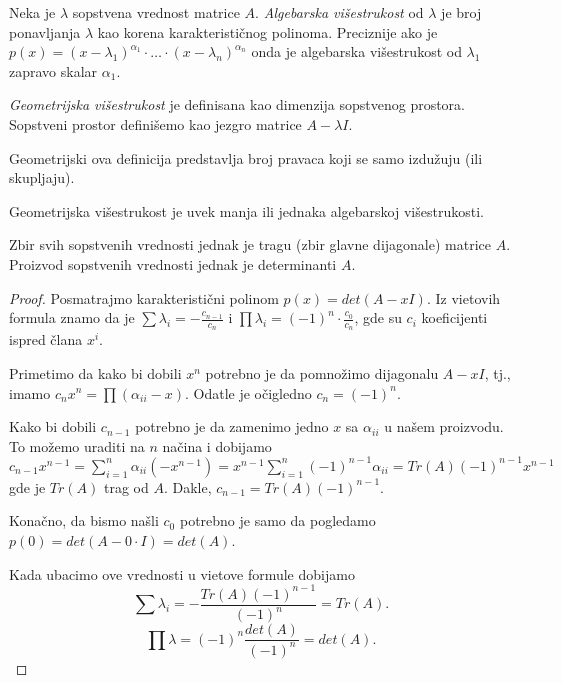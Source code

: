 \documentclass{article}
\begin{document}
\begin{definition}
  Neka je $\lambda$ sopstvena vrednost matrice $A$.
  \textit{Algebarska višestrukost} od $\lambda$ je broj ponavljanja $\lambda$ kao korena karakterističnog polinoma.
  Preciznije ako je $p(x) = (x - \lambda_1)^{\alpha_1} \cdot \ldots \cdot (x - \lambda_n)^{\alpha_n}$ onda je algebarska višestrukost od $\lambda_1$ zapravo skalar $\alpha_1$.
\end{definition}

\begin{definition}
  \textit{Geometrijska višestrukost} je definisana kao dimenzija sopstvenog prostora.
  Sopstveni prostor definišemo kao jezgro matrice $A - \lambda I$.
\end{definition}

Geometrijski ova definicija predstavlja broj pravaca koji se samo izdužuju (ili skupljaju).

\begin{theorem}
  Geometrijska višestrukost je uvek manja ili jednaka algebarskoj višestrukosti.
\end{theorem}

\begin{theorem}
  Zbir svih sopstvenih vrednosti jednak je tragu (zbir glavne dijagonale) matrice $A$.
  Proizvod sopstvenih vrednosti jednak je determinanti $A$.
\end{theorem}

\begin{proof}
  Posmatrajmo karakteristični polinom $p(x) = det(A - x I)$.
  Iz vietovih formula znamo da je $\sum \lambda_i = -\frac{c_{n - 1}}{c_n}$ i $\prod \lambda_i = (-1)^n \cdot \frac{c_0}{c_n}$, gde su $c_i$ koeficijenti ispred člana $x^i$.

  Primetimo da kako bi dobili $x^n$ potrebno je da pomnožimo dijagonalu $A - x I$, tj., imamo $c_n x^n = \prod (\alpha_{ii} - x)$.
  Odatle je očigledno $c_n = (-1)^n$.

  Kako bi dobili $c_{n - 1}$ potrebno je da zamenimo jedno $x$ sa $\alpha_{ii}$ u našem proizvodu.
  To možemo uraditi na $n$ načina i dobijamo $c_{n - 1} x^{n - 1} = \sum_{i = 1}^{n} \alpha_{ii} (-x^{n - 1}) = x^{n - 1} \sum_{i = 1}^{n} (-1)^{n - 1} \alpha_{ii} = Tr(A) (-1)^{n - 1} x^{n - 1}$ gde je $Tr(A)$ trag od $A$.
  Dakle, $c_{n - 1} = Tr(A) (-1)^{n - 1}$.

  Konačno, da bismo našli $c_0$ potrebno je samo da pogledamo $p(0) = det(A - 0 \cdot I) = det(A)$.

  Kada ubacimo ove vrednosti u vietove formule dobijamo
  \[\sum \lambda_i = -\frac{Tr(A) (-1)^{n - 1}}{(-1)^n} = Tr(A).\]
  \[\prod \lambda = (-1)^n \frac{det(A)}{(-1)^n} = det(A).\]
\end{proof}
\end{document}
